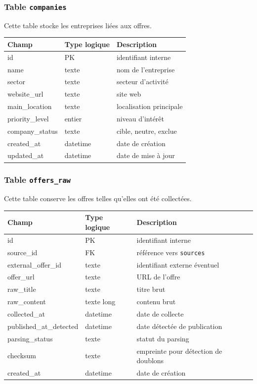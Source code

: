 \documentclass[11pt,a4paper]{article}
\begin{document}
\subsubsection{Table \texttt{companies}}

Cette table stocke les entreprises liées aux offres.

\begin{center}
\begin{tabular}{|l|l|l|}
\hline
\textbf{Champ} & \textbf{Type logique} & \textbf{Description} \\
\hline
id & PK & identifiant interne \\
name & texte & nom de l’entreprise \\
sector & texte & secteur d’activité \\
website_url & texte & site web \\
main_location & texte & localisation principale \\
priority_level & entier & niveau d’intérêt \\
company_status & texte & cible, neutre, exclue \\
created_at & datetime & date de création \\
updated_at & datetime & date de mise à jour \\
\hline
\end{tabular}
\end{center}

\subsubsection{Table \texttt{offers\_raw}}

Cette table conserve les offres telles qu’elles ont été collectées.

\begin{center}
\begin{tabular}{|l|l|l|}
\hline
\textbf{Champ} & \textbf{Type logique} & \textbf{Description} \\
\hline
id & PK & identifiant interne \\
source_id & FK & référence vers \texttt{sources} \\
external_offer_id & texte & identifiant externe éventuel \\
offer_url & texte & URL de l’offre \\
raw_title & texte & titre brut \\
raw_content & texte long & contenu brut \\
collected_at & datetime & date de collecte \\
published_at_detected & datetime & date détectée de publication \\
parsing_status & texte & statut du parsing \\
checksum & texte & empreinte pour détection de doublons \\
created_at & datetime & date de création \\
\hline
\end{tabular}
\end{center}
\end{document}
